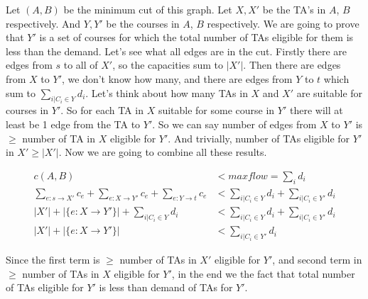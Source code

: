 \documentclass[12pt]{report}
\begin{document}
\begin{enumerate}[label=\textbf{\arabic*.}]
  Let $(A, B)$ be the minimum cut of this graph. Let $X, X'$ be the TA's in $A$, $B$ respectively. And $Y, Y'$ be the courses in $A$, $B$ 
  respectively. We are going to prove that $Y'$ is a set of courses for which the total number of TAs eligible for them is less than the demand.
  Let's see what all edges are in the cut. Firstly there are edges from $s$ to all of $X'$, so the capacities sum to $|X'|$. Then there are edges
  from $X$ to $Y'$, we don't know how many, and there are edges from $Y$ to $t$ which sum to $\sum_{i|C_i \in Y} d_i$. Let's think about how many TAs
  in $X$ and $X'$ are suitable for courses in $Y'$. So for each TA in $X$ suitable for some course in $Y'$ there will at least be 1 edge from the TA 
  to $Y'$. So we can say number of edges from $X$ to $Y'$ is $\geq$ number of TA in $X$ eligible for $Y'$. And trivially, number of TAs eligible for
  $Y'$ in $X' \geq |X'|$. Now we are going to combine all these results.
  
  \begin{align*}
    c(A,B) &< maxflow = \sum_i d_i \\
    \sum_{e:s \rightarrow X'} c_e + \sum_{e:X \rightarrow Y'} c_e + \sum_{e:Y \rightarrow t} c_e &< \sum_{i|C_i \in Y} d_i + \sum_{i|C_i \in Y'} d_i \\
    |X'| + |\{e:X \rightarrow Y'\}| + \sum_{i|C_i \in Y} d_i &< \sum_{i|C_i \in Y} d_i + \sum_{i|C_i \in Y'} d_i \\
    |X'| + |\{e:X \rightarrow Y'\}| &< \sum_{i|C_i \in Y'} d_i
  \end{align*}

  Since the first term is $\geq$ number of TAs in $X'$ eligible for $Y'$, and second term in $\geq$ number of TAs in $X$ eligible for $Y'$, in the end
  we the fact that total number of TAs eligible for $Y'$ is less than demand of TAs for $Y'$.


\end{enumerate}
\end{document}
